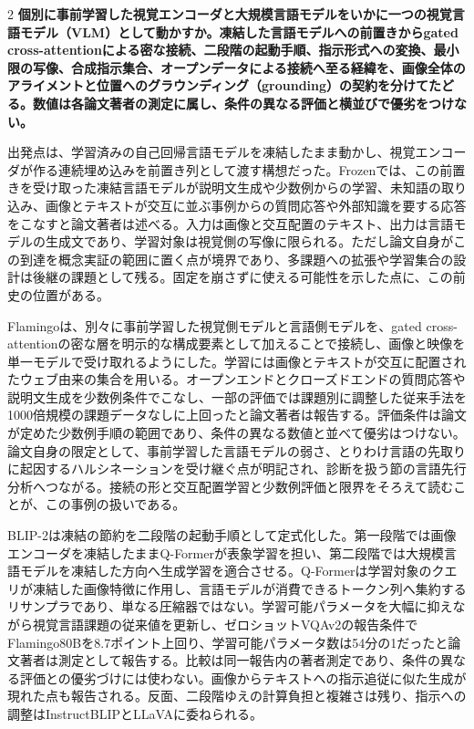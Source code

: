 \documentclass[lualatex,a4paper,10pt]{jlreq}
\begin{document}
\begin{multicols}{2}
\raggedcolumns
\noindent\textbf{個別に事前学習した視覚エンコーダと大規模言語モデルをいかに一つの視覚言語モデル（VLM）として動かすか。凍結した言語モデルへの前置きからgated cross-attentionによる密な接続、二段階の起動手順、指示形式への変換、最小限の写像、合成指示集合、オープンデータによる接続へ至る経緯を、画像全体のアライメントと位置へのグラウンディング（grounding）の契約を分けてたどる。数値は各論文著者の測定に属し、条件の異なる評価と横並びで優劣をつけない。}\autocite{vmd058,vmd059}\par\medskip
\noindent 出発点は、学習済みの自己回帰言語モデルを凍結したまま動かし、視覚エンコーダが作る連続埋め込みを前置き列として渡す構想だった。Frozenでは、この前置きを受け取った凍結言語モデルが説明文生成や少数例からの学習、未知語の取り込み、画像とテキストが交互に並ぶ事例からの質問応答や外部知識を要する応答をこなすと論文著者は述べる。入力は画像と交互配置のテキスト、出力は言語モデルの生成文であり、学習対象は視覚側の写像に限られる。ただし論文自身がこの到達を概念実証の範囲に置く点が境界であり、多課題への拡張や学習集合の設計は後継の課題として残る。固定を崩さずに使える可能性を示した点に、この前史の位置がある。\autocite{vmd057}\par\medskip
\noindent Flamingoは、別々に事前学習した視覚側モデルと言語側モデルを、gated cross-attentionの密な層を明示的な構成要素として加えることで接続し、画像と映像を単一モデルで受け取れるようにした。学習には画像とテキストが交互に配置されたウェブ由来の集合を用いる。オープンエンドとクローズドエンドの質問応答や説明文生成を少数例条件でこなし、一部の評価では課題別に調整した従来手法を1000倍規模の課題データなしに上回ったと論文著者は報告する。評価条件は論文が定めた少数例手順の範囲であり、条件の異なる数値と並べて優劣はつけない。論文自身の限定として、事前学習した言語モデルの弱さ、とりわけ言語の先取りに起因するハルシネーションを受け継ぐ点が明記され、診断を扱う節の言語先行分析へつながる。接続の形と交互配置学習と少数例評価と限界をそろえて読むことが、この事例の扱いである。\autocite{vmd058}\par\medskip
\noindent BLIP-2は凍結の節約を二段階の起動手順として定式化した。第一段階では画像エンコーダを凍結したままQ-Formerが表象学習を担い、第二段階では大規模言語モデルを凍結した方向へ生成学習を適合させる。Q-Formerは学習対象のクエリが凍結した画像特徴に作用し、言語モデルが消費できるトークン列へ集約するリサンプラであり、単なる圧縮器ではない。学習可能パラメータを大幅に抑えながら視覚言語課題の従来値を更新し、ゼロショットVQAv2の報告条件でFlamingo80Bを8.7ポイント上回り、学習可能パラメータ数は54分の1だったと論文著者は測定として報告する。比較は同一報告内の著者測定であり、条件の異なる評価との優劣づけには使わない。画像からテキストへの指示追従に似た生成が現れた点も報告される。反面、二段階ゆえの計算負担と複雑さは残り、指示への調整はInstructBLIPとLLaVAに委ねられる。\autocite{vmd059}\par\medskip

\end{multicols}
\end{document}
